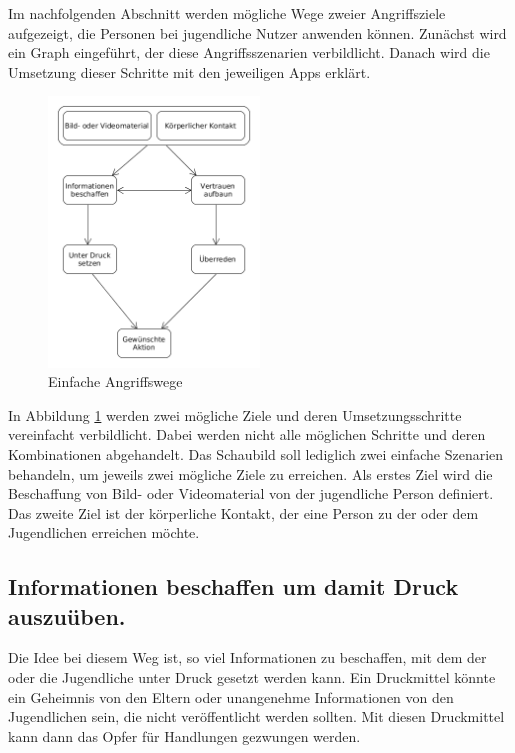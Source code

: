 Im nachfolgenden Abschnitt werden mögliche Wege zweier Angriffsziele aufgezeigt, die Personen bei jugendliche Nutzer anwenden können. Zunächst wird ein Graph eingeführt, der diese Angriffsszenarien verbildlicht. Danach wird die Umsetzung dieser Schritte mit den jeweiligen Apps erklärt.


\begin{figure}[h!]
\centering
\includegraphics[width=0.5\textwidth]{./resources/angriffsvektoren}
\caption{Einfache Angriffswege}
\label{vektoren_overview}
\end{figure} 



In Abbildung \ref{vektoren_overview} werden zwei mögliche Ziele und deren Umsetzungsschritte vereinfacht verbildlicht. Dabei werden nicht alle möglichen Schritte und deren Kombinationen abgehandelt. Das Schaubild soll lediglich zwei einfache Szenarien behandeln, um jeweils zwei mögliche Ziele zu erreichen. Als erstes Ziel wird die Beschaffung von Bild- oder Videomaterial von der jugendliche Person definiert.
Das zweite Ziel ist der körperliche Kontakt, der eine Person zu der oder dem Jugendlichen erreichen möchte. 

\subsection{Informationen beschaffen um damit Druck auszuüben.}

Die Idee bei diesem Weg ist, so viel Informationen zu beschaffen, mit dem der oder die Jugendliche unter Druck gesetzt werden kann. Ein Druckmittel könnte ein Geheimnis von den Eltern oder unangenehme Informationen von den Jugendlichen sein, die nicht veröffentlicht werden sollten. Mit diesen Druckmittel kann dann das Opfer für Handlungen gezwungen werden.

